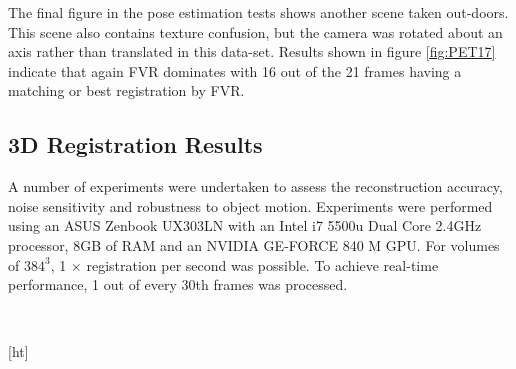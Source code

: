 The final figure in the pose estimation tests shows another scene taken out-doors. This scene also contains texture confusion, but the camera was rotated about an axis rather than translated in this data-set. Results shown in figure \ref{fig:PET17} indicate that again FVR dominates with 16 out of the 21 frames having a matching or best registration by FVR. 

\subsection{3D Registration Results}

A number of experiments were undertaken to assess the reconstruction accuracy, noise sensitivity and robustness to object motion. Experiments were performed using an ASUS Zenbook UX303LN with an Intel i7 5500u Dual Core 2.4GHz processor, 8GB of RAM and an NVIDIA GE-FORCE 840 M GPU. For volumes of $384^3$, 1 $\times$ registration per second was possible. To achieve real-time performance, 1 out of every 30th frames was processed.

\begin{table}[ht]
\centering
{}
\\
\caption{Translation Tracking}
\label{table:trans}
\end{table}[ht]







